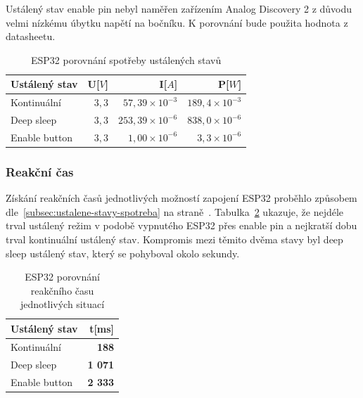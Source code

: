 \documentclass[a4paper, 12pt]{report}
\begin{document}
    Ustálený stav enable pin nebyl naměřen zařízením Analog Discovery 2 z důvodu velmi nízkému úbytku napětí na bočníku. K porovnání bude použita hodnota z datasheetu.
    \begin{table}[h]
        \centering
        \caption{ESP32 porovnání spotřeby ustálených stavů}
        \begin{tabular}{||l|r r r||}
            \hline
            Ustálený stav & U[$V$] & I[$A$]                  & P[$W$]                 \\
            \hline
            Kontinuální   & $3,3$  & $57,39 \times 10^{-3}$  & $189,4 \times 10^{-3}$ \\
            Deep sleep    & $3,3$  & $253,39 \times 10^{-6}$ & $838,0 \times 10^{-6}$ \\
            Enable button & $3,3$  & $1,00\times 10^{-6}$    & $3,3\times 10^{-6}$    \\
            \hline
        \end{tabular}
        \label{tab:esp32-klidove-rezimy-spotreba}
    \end{table}

    \subsubsection{Reakční čas}
    Získání reakčních časů jednotlivých možností zapojení ESP32 proběhlo způsobem dle~\ref{subsec:ustalene-stavy-spotreba} na straně~\pageref{subsec:ustalene-stavy-spotreba}. Tabulka~\ref{tab:esp32-klidove-rezimy-cas} ukazuje, že nejdéle trval ustálený režim v podobě vypnutého ESP32 přes enable pin a nejkratší dobu trval kontinuální ustálený stav. Kompromis mezi těmito dvěma stavy byl deep sleep ustálený stav, který se pohyboval okolo sekundy.

    \begin{table}[h]
        \centering
        \caption{ESP32 porovnání reakčního času jednotlivých situací}
        \begin{tabular}{||l|r||}
            \hline
            Ustálený stav & t[ms]           \\
            \hline
            Kontinuální   & \textbf{188}    \\
            Deep sleep    & \textbf{1 071} \\
            Enable button & \textbf{2 333} \\
            \hline
        \end{tabular}
        \label{tab:esp32-klidove-rezimy-cas}
    \end{table}
\end{document}
